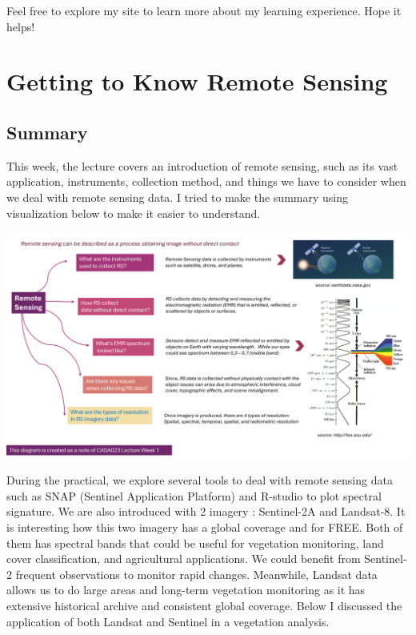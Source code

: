 \documentclass[
  letterpaper,
  DIV=11,
  numbers=noendperiod]{scrreprt}
\begin{document}
Feel free to explore my site to learn more about my learning experience.
Hope it helps!


\hypertarget{getting-to-know-remote-sensing}{%
\chapter{Getting to Know Remote
Sensing}\label{getting-to-know-remote-sensing}}

\hypertarget{summary}{%
\section{\texorpdfstring{\textbf{Summary}}{Summary}}\label{summary}}

This week, the lecture covers an introduction of remote sensing, such as
its vast application, instruments, collection method, and things we have
to consider when we deal with remote sensing data. I tried to make the
summary using visualization below to make it easier to understand.

\includegraphics{images/clipboard-1084697230.png}

During the practical, we explore several tools to deal with remote
sensing data such as SNAP (Sentinel Application Platform) and R-studio
to plot spectral signature. We are also introduced with 2 imagery :
Sentinel-2A and Landsat-8. It is interesting how this two imagery has a
global coverage and for FREE. Both of them has spectral bands that could
be useful for vegetation monitoring, land cover classification, and
agricultural applications. We could benefit from Sentinel-2 frequent
observations to monitor rapid changes. Meanwhile, Landsat data allows us
to do large areas and long-term vegetation monitoring as it has
extensive historical archive and consistent global coverage. Below I
discussed the application of both Landsat and Sentinel in a vegetation
analysis.
\end{document}
